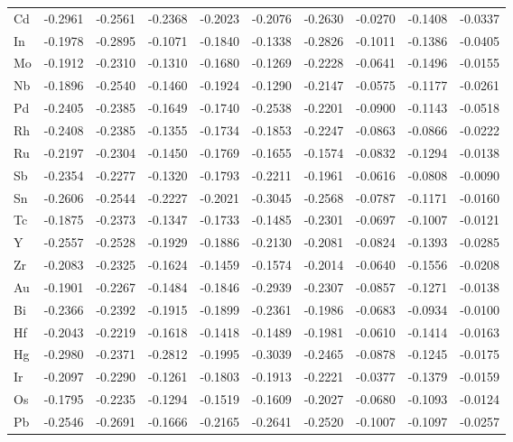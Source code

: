 \begin{table}[htbp]
{\begin{tabular}{l *{9}{l}}
      Cd & -0.2961 & -0.2561 & -0.2368 & -0.2023 & -0.2076 & -0.2630 & -0.0270 & -0.1408 & -0.0337 \\
      In & -0.1978 & -0.2895 & -0.1071 & -0.1840 & -0.1338 & -0.2826 & -0.1011 & -0.1386 & -0.0405 \\
      Mo & -0.1912 & -0.2310 & -0.1310 & -0.1680 & -0.1269 & -0.2228 & -0.0641 & -0.1496 & -0.0155 \\
      Nb & -0.1896 & -0.2540 & -0.1460 & -0.1924 & -0.1290 & -0.2147 & -0.0575 & -0.1177 & -0.0261 \\
      Pd & -0.2405 & -0.2385 & -0.1649 & -0.1740 & -0.2538 & -0.2201 & -0.0900 & -0.1143 & -0.0518 \\
      Rh & -0.2408 & -0.2385 & -0.1355 & -0.1734 & -0.1853 & -0.2247 & -0.0863 & -0.0866 & -0.0222 \\
      Ru & -0.2197 & -0.2304 & -0.1450 & -0.1769 & -0.1655 & -0.1574 & -0.0832 & -0.1294 & -0.0138 \\
      Sb & -0.2354 & -0.2277 & -0.1320 & -0.1793 & -0.2211 & -0.1961 & -0.0616 & -0.0808 & -0.0090 \\
      Sn & -0.2606 & -0.2544 & -0.2227 & -0.2021 & -0.3045 & -0.2568 & -0.0787 & -0.1171 & -0.0160 \\
      Tc & -0.1875 & -0.2373 & -0.1347 & -0.1733 & -0.1485 & -0.2301 & -0.0697 & -0.1007 & -0.0121 \\
      Y  & -0.2557 & -0.2528 & -0.1929 & -0.1886 & -0.2130 & -0.2081 & -0.0824 & -0.1393 & -0.0285 \\
      Zr & -0.2083 & -0.2325 & -0.1624 & -0.1459 & -0.1574 & -0.2014 & -0.0640 & -0.1556 & -0.0208 \\
      Au & -0.1901 & -0.2267 & -0.1484 & -0.1846 & -0.2939 & -0.2307 & -0.0857 & -0.1271 & -0.0138 \\
      Bi & -0.2366 & -0.2392 & -0.1915 & -0.1899 & -0.2361 & -0.1986 & -0.0683 & -0.0934 & -0.0100 \\
      Hf & -0.2043 & -0.2219 & -0.1618 & -0.1418 & -0.1489 & -0.1981 & -0.0610 & -0.1414 & -0.0163 \\
      Hg & -0.2980 & -0.2371 & -0.2812 & -0.1995 & -0.3039 & -0.2465 & -0.0878 & -0.1245 & -0.0175 \\
      Ir & -0.2097 & -0.2290 & -0.1261 & -0.1803 & -0.1913 & -0.2221 & -0.0377 & -0.1379 & -0.0159 \\
      Os & -0.1795 & -0.2235 & -0.1294 & -0.1519 & -0.1609 & -0.2027 & -0.0680 & -0.1093 & -0.0124 \\
      Pb & -0.2546 & -0.2691 & -0.1666 & -0.2165 & -0.2641 & -0.2520 & -0.1007 & -0.1097 & -0.0257 \\

\end{tabular}}
\end{table}
